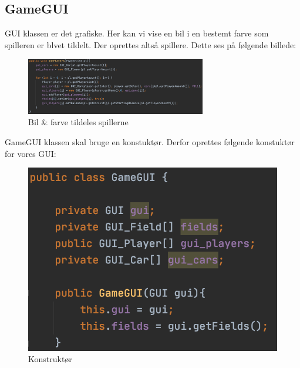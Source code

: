 \subsection{GameGUI}
GUI klassen er det grafiske. Her kan vi vise en bil i en bestemt farve som spilleren er blvet tildelt. Der oprettes altså spillere. Dette ses på følgende billede:

\begin{figure}[H]
    \centering
    \includegraphics[width=0.7\textwidth]{sources/7_implementering/GameGUIaddPlayers.png}
    \caption{Bil \& farve tildeles spillerne}
    \label{fig:playerListklasse}
\end{figure}

GameGUI klassen skal bruge en konstuktør. Derfor oprettes følgende konstuktør for vores GUI:
\begin{figure}[H]
    \centering
    \includegraphics{sources/7_implementering/GameGUIclass.png}
    \caption{Konstruktør}
    \label{fig:playerListklasse}
\end{figure}

